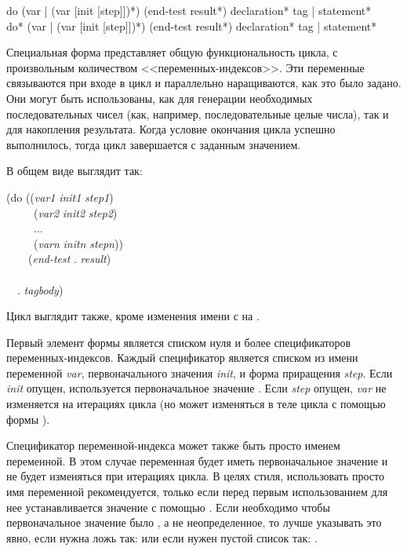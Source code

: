 \begin{defmac}
do ({var | (var [init [step]])}*)
   (end-test {result}*)
   {declaration}* {tag | statement}* \\
do* ({var | (var [init [step]])}*)
    (end-test {result}*)
    {declaration}* {tag | statement}*

Специальная форма  представляет общую функциональность цикла, с
произвольным количеством <<переменных-индексов>>.
Эти переменные связываются при входе в цикл и параллельно наращиваются, как это
было задано. Они могут быть использованы, как для генерации необходимых
последовательных чисел (как, например, последовательные целые числа), так и для
накопления результата.
Когда условие окончания цикла успешно выполнилось, тогда цикл завершается с
заданным значением.

В общем виде  выглядит так:
\begin{lisp}
(do ((\emph{var1} \emph{init1} \emph{step1}) \\
~~~~~(\emph{var2} \emph{init2} \emph{step2}) \\
~~~~~... \\
~~~~~(\emph{varn} \emph{initn} \emph{stepn})) \\
~~~~(\emph{end-test} . \emph{result}) \\
~~ \\
~~. \emph{tagbody})
\end{lisp}
Цикл  выглядит также, кроме изменения имени с  на .

Первый элемент формы является списком нуля и более спецификаторов
переменных-индексов. Каждый спецификатор является списком из имени переменной
\emph{var}, первоначального значения \emph{init}, и форма приращения
\emph{step}.
Если \emph{init} опущен, используется первоначальное значение {\false}.
Если \emph{step} опущен, \emph{var} не изменяется на итерациях цикла (но может
изменяться в теле цикла с помощью формы ).

Спецификатор переменной-индекса может также быть просто именем переменной.
В этом случае переменная будет иметь первоначальное значение {\false} и не будет
изменяться при итерациях цикла.
В целях стиля, использовать просто имя переменной рекомендуется, только если перед
первым использованием для нее устанавливается значение с помощью .
Если необходимо чтобы первоначальное значение было {\false}, а не
неопределенное, то лучше указывать это явно, если нужна ложь так:
или если нужен пустой список так:
.


\end{defmac}
